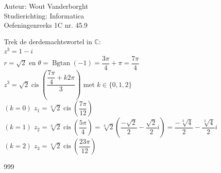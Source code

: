 \documentclass[a4paper]{article}
\newcommand{\C}{\mathbb{C}}
\newcommand{\Bgtan}{\operatorname{Bgtan}}
\newcommand{\cis}{\operatorname{cis}}
\begin{document}
  
\noindent \large Auteur: Wout Vanderborght\\
\noindent \large Studierichting: Informatica\\
\noindent \large Oefeningenreeks 1C nr. 45.9\\

\medskip

\normalsize

Trek de derdemachtswortel in $ \C $: \\

$ z^3=1-i $ \\

$ r = \sqrt{2} $ en $ \theta = \Bgtan(-1) = \dfrac{3\pi}{4} + \pi  = \dfrac{7\pi}{4} $ \\

$ z^3 = \sqrt{2}\cis\left(\dfrac{\dfrac{7\pi}{4} + k2\pi}{3}\right) $ met $ k \in \{0,1,2\} $ \\

$ (k = 0) $ $ z_1 = \sqrt[6]{2}\cis\left(\dfrac{7\pi}{12}\right) $ \\

$ (k = 1) $ $ z_2 = \sqrt[6]{2}\cis\left(\dfrac{5\pi}{4}\right) = \sqrt[6]{2}\left(\dfrac{-\sqrt{2}}{2}-\dfrac{\sqrt{2}}{2}i\right) = \dfrac{-\sqrt[3]{4}}{2}-\dfrac{\sqrt[3]{4}}{2}i $ \\

$ (k = 2) $ $ z_3 = \sqrt[6]{2}\cis\left(\dfrac{23\pi}{12}\right) $ \\

\begin{thebibliography}{999}
\end{thebibliography}
\end{document}
